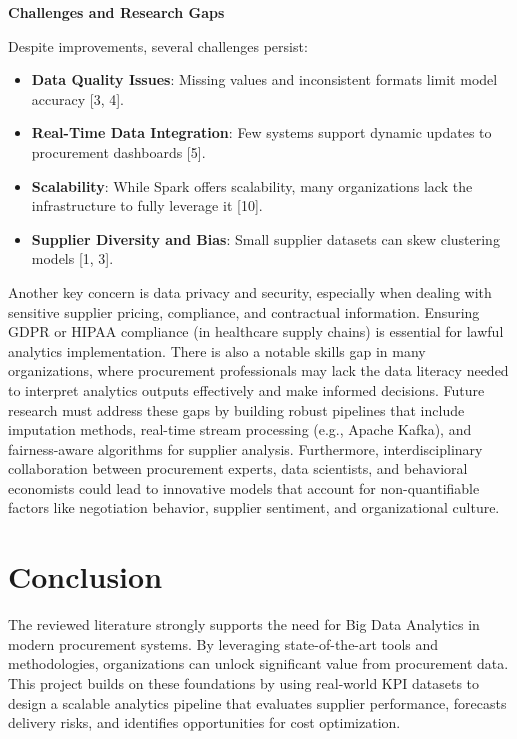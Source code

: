 \documentclass[10pt, onecolumn]{article}
\begin{document}
\vspace{\baselineskip}
\noindent\textbf{Challenges and Research Gaps}
\vspace{\baselineskip}

Despite improvements, several challenges persist:

\begin{itemize}
  \item \textbf{Data Quality Issues}: Missing values and inconsistent formats limit model accuracy [3, 4].
  \item \textbf{Real-Time Data Integration}: Few systems support dynamic updates to procurement dashboards [5].
  \item \textbf{Scalability}: While Spark offers scalability, many organizations lack the infrastructure to fully leverage it [10].
  \item \textbf{Supplier Diversity and Bias}: Small supplier datasets can skew clustering models [1, 3].
\end{itemize} 

Another key concern is data privacy and security, especially when dealing with sensitive supplier pricing, compliance, and contractual information. Ensuring GDPR or HIPAA compliance (in healthcare supply chains) is essential for lawful analytics implementation.
\vspace{\baselineskip}
There is also a notable skills gap in many organizations, where procurement professionals may lack the data literacy needed to interpret analytics outputs effectively and make informed decisions.
\vspace{\baselineskip}
Future research must address these gaps by building robust pipelines that include imputation methods, real-time stream processing (e.g., Apache Kafka), and fairness-aware algorithms for supplier analysis.
\vspace{\baselineskip}
Furthermore, interdisciplinary collaboration between procurement experts, data scientists, and behavioral economists could lead to innovative models that account for non-quantifiable factors like negotiation behavior, supplier sentiment, and organizational culture.

\section{\textbf{Conclusion}}

The reviewed literature strongly supports the need for Big Data Analytics in modern procurement systems. By leveraging state-of-the-art tools and methodologies, organizations can unlock significant value from procurement data. This project builds on these foundations by using real-world KPI datasets to design a scalable analytics pipeline that evaluates supplier performance, forecasts delivery risks, and identifies opportunities for cost optimization.
\end{document}
